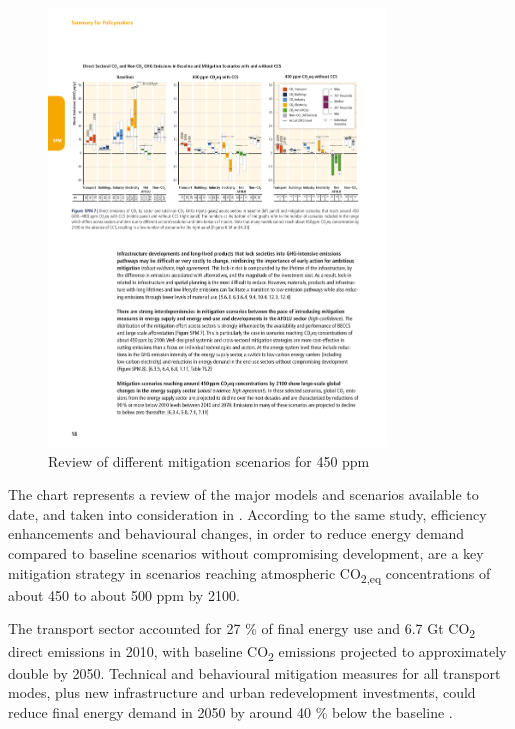 \documentclass[12pt]{report}   %
\begin{document}
\begin{figure}[ht]
  \centering
  \includegraphics[width=0.8\textwidth]{figures/introduction/mitigation_scenarios.pdf}
  \caption{Review of different mitigation scenarios for 450 ppm \label{fig:mitigationscenarios}}
\end{figure}

The chart represents a review of the major models and scenarios available to date, and taken into consideration in \cite{IPCC2014}. According to the same study, efficiency enhancements and behavioural changes, in order to reduce energy demand compared to baseline scenarios without compromising development, are a key mitigation strategy in scenarios reaching atmospheric CO\textsubscript{2,eq} concentrations of about 450 to about 500 ppm by 2100.

The transport sector accounted for 27 \% of final energy use and 6.7 Gt CO\textsubscript{2} direct emissions in 2010, with baseline CO\textsubscript{2} emissions projected to approximately double by 2050. Technical and behavioural mitigation measures for all transport modes, plus new infrastructure and urban redevelopment investments, could reduce final energy demand in 2050 by around 40 \% below the baseline \cite{IPCC2014}.
\end{document}
